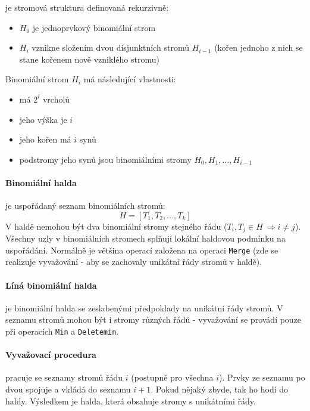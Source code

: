 \documentclass[a4paper]{article}      %
\newenvironment{definition}[1][Definice]{\begin{trivlist}
\item[\hskip \labelsep {\bfseries #1}]}{\end{trivlist}}
\begin{document}
\begin{definition}[Binomiální strom] je stromová struktura definovaná rekurzivně:
\begin{itemize}
\item $H_0$ je jednoprvkový binomiální strom
\item $H_i$ vznikne složením dvou disjunktních stromů $H_{i-1}$ (kořen jednoho z nich se stane kořenem nově vzniklého stromu)
\end{itemize}
Binomiální strom $H_i$ má následující vlastnosti:
\begin{itemize}
\item má $2^{i}$ vrcholů
\item jeho výška je $i$
\item jeho kořen má $i$ synů
\item podstromy jeho synů jsou binomiálními stromy $H_0,H_1,\ldots,H_{i-1}$  
\end{itemize}
\end{definition}

\paragraph{Binomiální halda} je uspořádaný seznam binomiálních stromů:
\[
H = [T_1,T_2,\ldots,T_k]
\]
V haldě nemohou být dva binomiální stromy stejného řádu ($T_i,T_j \in H\ \Rightarrow i\neq j $).
Všechny uzly v binomiálních stromech splňují lokální haldovou podmínku na uspořádání.
Normálně je většina operací založena na operaci \verb+Merge+ (zde se realizuje vyvažování - aby se zachovaly unikátní řády stromů v haldě).

\paragraph{Líná binomiální halda} je binomiální halda se zeslabenými předpoklady na unikátní řády stromů.
V seznamu stromů mohou být i stromy různých řádů - vyvažování se provádí pouze při operacích \verb+Min+ a \verb+Deletemin+.

\paragraph{Vyvažovací procedura} pracuje se seznamy stromů řádu $i$ (postupně pro všechna $i$). Prvky ze seznamu po dvou spojuje a vkládá do seznamu $i+1$. Pokud nějaký zbyde, tak ho hodí do haldy. Výsledkem je halda, která obsahuje stromy s unikátními řády.
\end{document}
